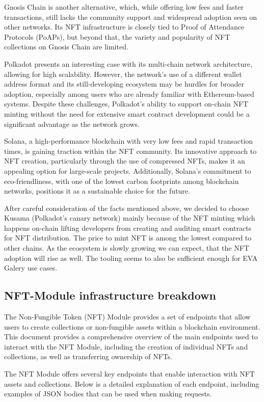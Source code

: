 Gnosis Chain is another alternative, which, while offering low fees and faster transactions, still lacks the community support and widespread adoption seen on other networks. Its NFT infrastructure is closely tied to Proof of Attendance Protocols (PoAPs), but beyond that, the variety and popularity of NFT collections on Gnosis Chain are limited.

Polkadot presents an interesting case with its multi-chain network architecture, allowing for high scalability. However, the network’s use of a different wallet address format and its still-developing ecosystem may be hurdles for broader adoption, especially among users who are already familiar with Ethereum-based systems. Despite these challenges, Polkadot’s ability to support on-chain NFT minting without the need for extensive smart contract development could be a significant advantage as the network grows.

Solana, a high-performance blockchain with very low fees and rapid transaction times, is gaining traction within the NFT community. Its innovative approach to NFT creation, particularly through the use of compressed NFTs, makes it an appealing option for large-scale projects. Additionally, Solana's commitment to eco-friendliness, with one of the lowest carbon footprints among blockchain networks, positions it as a sustainable choice for the future.

After careful consideration of the facts mentioned above, we decided to choose Kusama (Polkadot's canary network) mainly because of the NFT minting which happens on-chain lifting developers from creating and auditing smart contracts for NFT distribution. The price to mint NFT is among the lowest compared to other chains. As the ecosystem is slowly growing we can expect, that the NFT adoption will rise as well. The tooling seems to also be sufficient enough for EVA Galery use cases.

\subsection{NFT-Module infrastructure breakdown}
The Non-Fungible Token (NFT) Module provides a set of endpoints that allow users to create collections or non-fungible assets within a blockchain environment. This document provides a comprehensive overview of the main endpoints used to interact with the NFT Module, including the creation of individual NFTs and collections, as well as transferring ownership of NFTs.

The NFT Module offers several key endpoints that enable interaction with NFT assets and collections. Below is a detailed explanation of each endpoint, including examples of JSON bodies that can be used when making requests.

